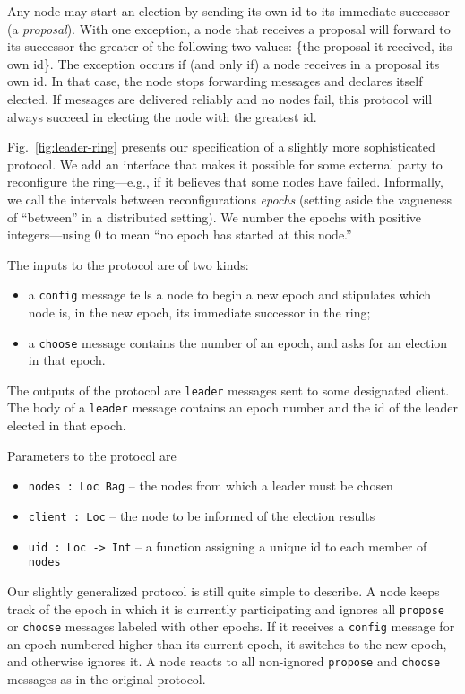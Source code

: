 \documentclass[final]{article}
\begin{document}

Any node may start an election by sending its own id to its immediate
successor (a \emph{proposal}).  With one exception, a node that
receives a proposal will forward to its successor the greater of the
following two values: \{the proposal it received, its own id\}.  The
exception occurs if (and only if) a node receives in a proposal its
own id.  In that case, the node stops forwarding messages and declares
itself elected.  If messages are delivered reliably and no nodes fail,
this protocol will always succeed in electing the node with the
greatest id.

Fig.~\ref{fig:leader-ring} presents our specification of a slightly
more sophisticated protocol.  We add an interface that makes it
possible for some external party to reconfigure the ring---e.g., if it
believes that some nodes have failed.  Informally, we call the
intervals between reconfigurations \emph{epochs} (setting aside the
vagueness of ``between'' in a distributed setting).  We number the
epochs with positive integers---using 0 to mean ``no epoch has started
at this node.''

The inputs to the protocol are of two kinds:
\begin{itemize}
\item a \lstinline{config} message tells a node to begin a new
  epoch and stipulates which node is, in the new epoch, its immediate
  successor in the ring;
\item a \lstinline{choose} message contains the number of an
  epoch, and asks for an election in that epoch.
\end{itemize}

The outputs of the protocol are \lstinline{leader} messages sent to
some designated client.  The body of a \lstinline{leader} message
contains an epoch number and the id of the leader elected in that
epoch.

Parameters to the protocol are
\begin{itemize}
\item \lstinline{nodes : Loc Bag} -- the nodes from which a leader
  must be chosen
\item \lstinline{client : Loc} -- the node to be informed of the
  election results
\item \lstinline{uid : Loc -> Int} -- a function assigning a unique id to each
  member of \lstinline{nodes}
\end{itemize}

Our slightly generalized protocol is still quite simple to describe.
A node keeps track of the epoch in which it is currently participating
and ignores all \lstinline{propose} or
\lstinline{choose} messages labeled with other epochs.  If it
receives a \lstinline{config} message for an epoch numbered higher
than its current epoch, it switches to the new epoch, and otherwise
ignores it.  A node reacts to all non-ignored \lstinline{propose}
and \lstinline{choose} messages as in the original protocol.
\end{document}
